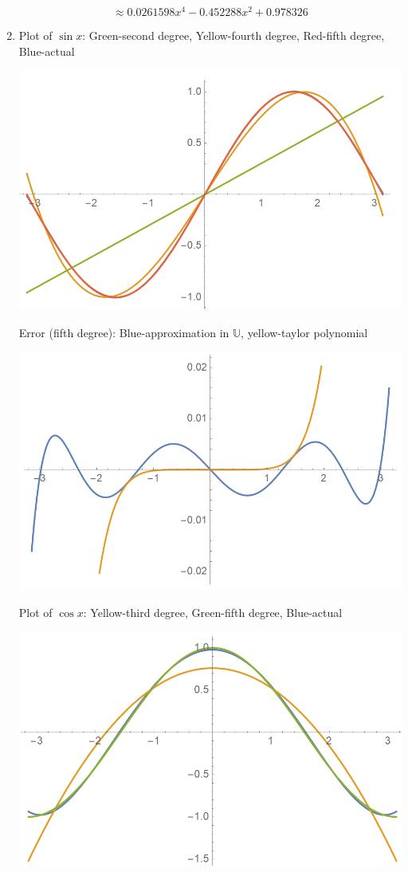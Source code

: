 \begin{sol}
\begin{enumerate}[label=\textbf{(\alph*)}]
\begin{equation}
	\approx 0.0261598x^4-0.452288x^2+0.978326
\end{equation} 
\item 
Plot of $\sin x$: Green-second degree, Yellow-fourth degree, Red-fifth degree, Blue-actual\\
\begin{center}
\includegraphics[scale=0.7]{P04/sinx.PNG}
\end{center}
Error (fifth degree): Blue-approximation in $\mathbb U$, yellow-taylor polynomial
\begin{center}
\includegraphics[scale=0.7]{P04/sin error.PNG}
\end{center}
Plot of $\cos x$: Yellow-third degree, Green-fifth degree, Blue-actual
\begin{center}
\includegraphics[scale=0.7]{P04/cosx.PNG}

\end{center}
\end{enumerate}
\end{sol}
